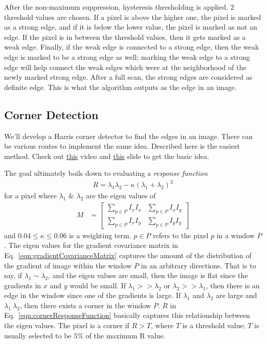 \documentclass{report}
\begin{document}
After the non-maximum suppression, hysteresis thresholding is applied. $2$ threshold values are chosen. If a pixel is above the higher one, the pixel is marked as a strong edge, and if it is below the lower value, the pixel is marked as not an edge. If the pixel is in between the threshold values, then it gets marked as a weak edge. Finally, if the weak edge is connected to a strong edge, then the weak edge is marked to be a strong edge as well; marking the weak edge to a strong edge will help connect the weak edges which were at the neighborhood of the newly marked strong edge. After a full scan, the strong edges are considered as definite edge. This is what the algorithm outputs as the edge in an image.

\subsection{Corner Detection}
\hspace{\parindent}We'll develop a Harris corner detector to find the edges in an image. There can be various routes to implement the same idea. Described here is the easiest method. Check out \href{https://www.youtube.com/watch?v=Z_HwkG90Yvw&t=566s}{this} video and \href{https://www.cs.cmu.edu/~16385/s17/Slides/6.2_Harris_Corner_Detector.pdf}{this} slide to get the basic idea.

The goal ultimately boils down to evaluating a \textit{response function}
\begin{align}
	R = \lambda_1 \lambda_2 - \kappa (\lambda_1 + \lambda_2)^2
	\label{eqn:cornerResponseFunction}
\end{align}
for a pixel where $\lambda_1$ \& $\lambda_2$ are the eigen values of
\begin{align}
	M &= \begin{bmatrix}
			\sum_{p \in P} I_x I_x  &  \sum_{p \in P} I_x I_y \\
			\sum_{p \in P} I_x I_y  &  \sum_{p \in P} I_y I_y 
		\end{bmatrix}
	\label{eqn:gradientCovarianceMatrix}
\end{align}
and $0.04 \leq \kappa \leq 0.06$ is a weighting term. $p \in P$ refers to the pixel $p$ in a window $P$. The eigen values for the gradient covariance matrix in Eq.~\ref{eqn:gradientCovarianceMatrix} captures the amount of the distribution of the gradient of image within the window $P$ in an arbitrary directions. That is to say, if $\lambda_1 \sim \lambda_2$, and the eigen values are small, then the image is flat since the gradients in $x$ and $y$ would be small. If $\lambda_1 >> \lambda_2$ or $\lambda_2 >> \lambda_1$, then there is an edge in the window since one of the gradients is large. If $\lambda_1$ and $\lambda_2$ are large and $\lambda_1 ~ \lambda_2$, then there exists a corner in the window $P$. $R$ in Eq.~\ref{eqn:cornerResponseFunction} basically captures this relationship between the eigen values. The pixel is a corner if $R > T$, where $T$ is a threshold value; $T$ is usually selected to be $5\%$ of the maximum R value.
\end{document}
